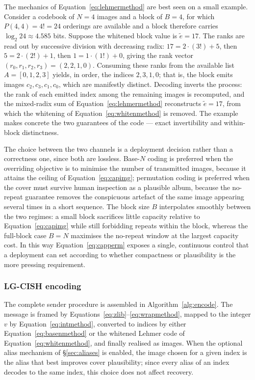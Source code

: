 \documentclass[10pt,a4paper]{article}
\theoremstyle{definition}
\begin{document}
The mechanics of Equation~\eqref{eq:lehmermethod} are best seen on a small example. Consider a
codebook of $N=4$ images and a block of $B=4$, for which $P(4,4)=4!=24$ orderings
are available and a block therefore carries $\log_2 24\approx 4.585$ bits. Suppose
the whitened block value is $\tilde e=17$. The ranks are read out by successive
division with decreasing radix: $17 = 2\cdot(3!) + 5$, then $5 = 2\cdot(2!) + 1$,
then $1 = 1\cdot(1!) + 0$, giving the rank vector $(r_0,r_1,r_2,r_3)=(2,2,1,0)$.
Consuming these ranks from the available list $A=[0,1,2,3]$ yields, in order, the
indices $2,3,1,0$; that is, the block emits images $c_2,c_3,c_1,c_0$, which are
manifestly distinct. Decoding inverts the process: the rank of each emitted index
among the remaining images is recomputed, and the mixed-radix sum of
Equation~\eqref{eq:lehmermethod} reconstructs $\tilde e=17$, from which the whitening of
Equation~\eqref{eq:whitenmethod} is removed. The example makes concrete the two guarantees of
the code --- exact invertibility and within-block distinctness.

The choice between the two channels is a deployment decision rather than a
correctness one, since both are lossless. Base-$N$ coding is preferred when the
overriding objective is to minimise the number of transmitted images, because it
attains the ceiling of Equation~\eqref{eq:capimg}; permutation coding is preferred when the
cover must survive human inspection as a plausible album, because the no-repeat
guarantee removes the conspicuous artefact of the same image appearing several times
in a short sequence. The block size $B$ interpolates smoothly between the two
regimes: a small block sacrifices little capacity relative to Equation~\eqref{eq:capimg} while
still forbidding repeats within the block, whereas the full-block case $B=N$ maximises
the no-repeat window at the largest capacity cost. In this way Equation~\eqref{eq:capperm}
exposes a single, continuous control that a deployment can set according to whether
compactness or plausibility is the more pressing requirement.

\subsubsection{LG-CISH encoding}\label{sec:encode}
The complete sender procedure is assembled in Algorithm~\ref{alg:encode}. The
message is framed by Equations~\eqref{eq:zlib}--\eqref{eq:wrapmethod}, mapped to the integer $v$
by Equation~\eqref{eq:intmethod}, converted to indices by either Equation~\eqref{eq:basenmethod} or the
whitened Lehmer code of Equation~\eqref{eq:whitenmethod}, and finally realised as images. When
the optional alias mechanism of \S\ref{sec:aliases} is enabled, the image chosen
for a given index is the alias that best improves cover plausibility; since every
alias of an index decodes to the same index, this choice does not affect recovery.
\end{document}
